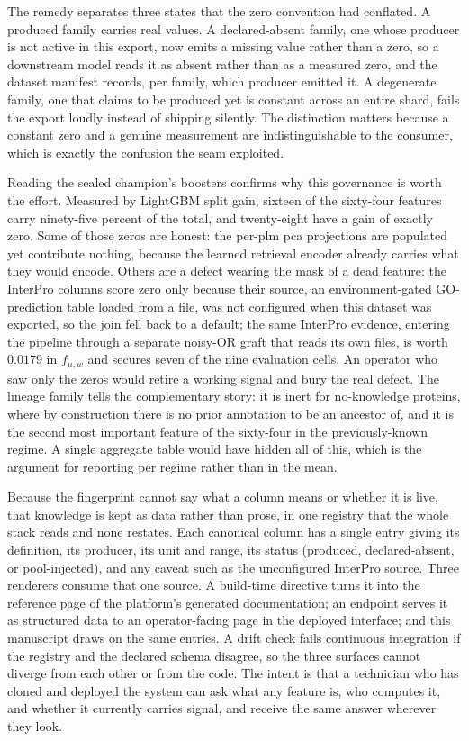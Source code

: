 The remedy separates three states that the zero convention had conflated.
A produced family carries real values. A declared-absent family, one
whose producer is not active in this export, now emits a missing value
rather than a zero, so a downstream model reads it as absent rather than
as a measured zero, and the dataset manifest records, per family, which
producer emitted it. A degenerate family, one that claims to be produced
yet is constant across an entire shard, fails the export loudly instead
of shipping silently. The distinction matters because a constant zero and
a genuine measurement are indistinguishable to the consumer, which is
exactly the confusion the seam exploited.

Reading the sealed champion's boosters confirms why this governance is
worth the effort. Measured by LightGBM split gain, sixteen of the
sixty-four features carry ninety-five percent of the total, and
twenty-eight have a gain of exactly zero. Some of those zeros are honest:
the per-\gls{plm} \gls{pca} projections are populated yet contribute
nothing, because the learned retrieval encoder already carries what they
would encode. Others are a defect wearing the mask of a dead feature: the
InterPro columns score zero only because their source, an
environment-gated GO-prediction table loaded from a file, was not
configured when this dataset was exported, so the join fell back to a
default; the same InterPro evidence, entering the pipeline through a
separate noisy-OR graft that reads its own files, is worth $0.0179$ in
$f_{\mu,w}$ and secures seven of the nine evaluation cells.
An operator who saw only the zeros would retire a working signal and bury
the real defect. The lineage family tells the complementary story: it is
inert for no-knowledge proteins, where by construction there is no prior
annotation to be an ancestor of, and it is the second most important
feature of the sixty-four in the previously-known regime. A single
aggregate table would have hidden all of this, which is the argument for
reporting per regime rather than in the mean.

Because the fingerprint cannot say what a column means or whether it is
live, that knowledge is kept as data rather than prose, in one registry
that the whole stack reads and none restates. Each canonical column has a
single entry giving its definition, its producer, its unit and range, its
status (produced, declared-absent, or pool-injected), and any caveat such
as the unconfigured InterPro source. Three renderers consume that one source. A
build-time directive turns it into the reference page of the platform's
generated documentation; an endpoint serves it as structured data to an
operator-facing page in the deployed interface; and this manuscript draws
on the same entries. A drift check fails continuous integration if the
registry and the declared schema disagree, so the three surfaces cannot
diverge from each other or from the code. The intent is that a technician
who has cloned and deployed the system can ask what any feature is, who
computes it, and whether it currently carries signal, and receive the
same answer wherever they look.


